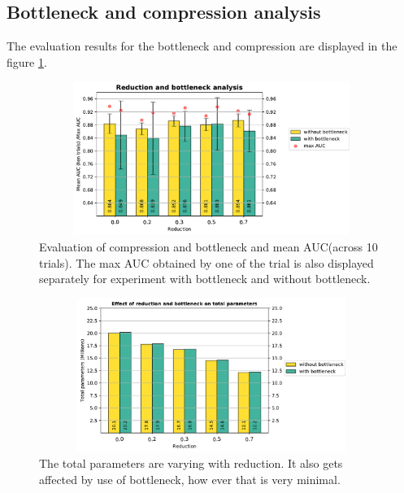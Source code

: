 
\subsection{Bottleneck and compression analysis}
The evaluation results for the bottleneck and compression are displayed in the figure \ref{fig:compression_and_bottleneck_vs_auc}.

\begin{figure}[ht]
\centering
\includegraphics[width=12cm,height=5cm]{images/densenet/siamese/densenet_siamese_reduction_bottleneck}
\caption{Evaluation of compression and bottleneck and mean AUC(across 10 trials). The max AUC obtained by one of the trial is also displayed separately for experiment with bottleneck and without bottleneck.}
\label{fig:compression_and_bottleneck_vs_auc}
\end{figure}

\begin{figure}[ht]
\centering
\includegraphics[width=12cm,height=5cm]{images/densenet/siamese/densenet_siamese_params_reduction_bottleneck}
\caption{The total parameters are varying with reduction. It also gets affected by use of bottleneck, how ever that is very minimal.}
\label{fig:compression_and_bn_vs_parameters}
\end{figure}

